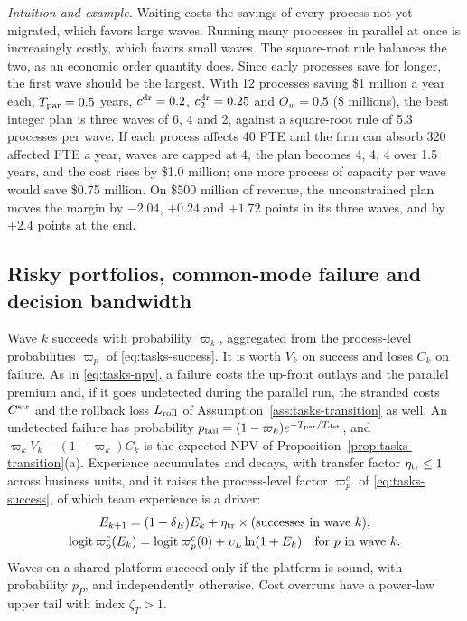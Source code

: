 \noindent\emph{Intuition and example.} Waiting costs the savings of every process not yet migrated, which favors large waves. Running many processes in parallel at once is increasingly costly, which favors small waves. The square-root rule balances the two, as an economic order quantity does. Since early processes save for longer, the first wave should be the largest. With 12 processes saving \$1 million a year each, $T_{\rm par}=0.5$ years, $c^{\rm dr}_1=0.2$, $c^{\rm dr}_2=0.25$ and $O_w=0.5$ (\$ millions), the best integer plan is three waves of 6, 4 and 2, against a square-root rule of 5.3 processes per wave. If each process affects 40 FTE and the firm can absorb 320 affected FTE a year, waves are capped at 4, the plan becomes 4, 4, 4 over 1.5 years, and the cost rises by \$1.0 million; one more process of capacity per wave would save \$0.75 million. On \$500 million of revenue, the unconstrained plan moves the margin by $-2.04$, $+0.24$ and $+1.72$ points in its three waves, and by $+2.4$ points at the end.

\subsection{Risky portfolios, common-mode failure and decision bandwidth}\label{sec:ext-bandwidth}

\begin{assumption}\label{ass:ext-portfolio}
Wave $k$ succeeds with probability $\varpi_k$, aggregated from the process-level probabilities $\varpi_p$ of \eqref{eq:tasks-success}. It is worth $V_k$ on success and loses $C_k$ on failure. As in \eqref{eq:tasks-npv}, a failure costs the up-front outlays and the parallel premium and, if it goes undetected during the parallel run, the stranded costs $C^{\rm str}$ and the rollback loss $L_{\rm roll}$ of Assumption~\ref{ass:tasks-transition} as well. An undetected failure has probability $p_{\rm fail}=(1-\varpi_k)e^{-T_{\rm par}/T_{\rm det}}$, and $\varpi_kV_k-(1-\varpi_k)C_k$ is the expected NPV of Proposition~\ref{prop:tasks-transition}(a). Experience accumulates and decays, with transfer factor $\eta_{\rm tr}\le1$ across business units, and it raises the process-level factor $\varpi^c_p$ of \eqref{eq:tasks-success}, of which team experience is a driver:
\begin{gather*}
E_{k+1}=(1-\delta_E)E_k+\eta_{\rm tr}\times(\text{successes in wave }k),\\
{\rm logit}\,\varpi^c_p(E_k)={\rm logit}\,\varpi^c_p(0)+\upsilon_L\ln(1+E_k)\quad\text{for }p\text{ in wave }k.
\end{gather*}
Waves on a shared platform succeed only if the platform is sound, with probability $p_P$, and independently otherwise. Cost overruns have a power-law upper tail with index $\zeta_T>1$.
\end{assumption}

